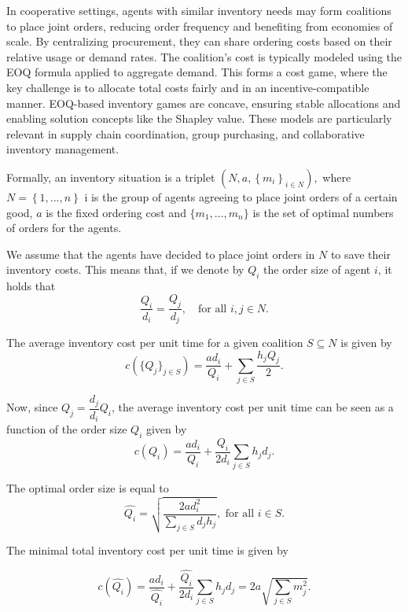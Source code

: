 \documentclass[12pt]{article}
\begin{document}
\noindent In cooperative settings, agents with similar inventory needs may form coalitions to place joint orders, reducing order frequency and benefiting from economies of scale. By centralizing procurement, they can share ordering costs based on their relative usage or demand rates. The coalition’s cost is typically modeled using the EOQ formula applied to aggregate demand. This forms a cost game, where the key challenge is to allocate total costs fairly and in an incentive-compatible manner. EOQ-based inventory games are concave, ensuring stable allocations and enabling solution concepts like the Shapley value. These models are particularly relevant in supply chain coordination, group purchasing, and collaborative inventory management.

\noindent Formally, an inventory situation is a triplet $\left( N,a,\left\{
m_{i}\right\} _{i\in N}\right) ,$ where $N=\left\{ 1,...,n\right\} $ i is the group of agents agreeing to place joint orders of a certain good, $a$
is the fixed ordering cost and $\{m_{1},\ldots ,m_{n}\}$ is the set of optimal
numbers of orders for the agents. 

We assume that the agents have decided to place joint orders in \( N \)  to save their
inventory costs. This means that, if we denote by \( Q_i \) the order size of  agent \( i \), it holds that 
\[
\frac{Q_i}{d_i} = \frac{Q_j}{d_j}, \quad \text{for all } i, j \in N.
\]

The average inventory cost per unit time for a given coalition $S \subseteq N$ is given by 
\begin{equation*}
c(\{Q_{j}\}_{j \in S})=\dfrac{ad_{i}}{Q_{i}}+\sum_{j\in S}\dfrac{h_{j}Q_{j}}{2}.
\end{equation*}


\noindent Now, since $Q_{j}=\dfrac{d_j}{d_i}Q_i$, the average inventory cost per unit time can be seen as a function of the order size $Q_{i}$ given by 
\begin{equation*}
c(Q_{i})=\dfrac{ad_{i}}{Q_{i}}+\dfrac{Q_{i}}{2d_{i}}\sum_{j\in S}h_{j}d_{j}.
\end{equation*}

The optimal order size is equal to 
\begin{equation*}
\hat {Q_{i}}=\sqrt{\dfrac{2ad_{i}^{2}}{\sum\nolimits_{j\in S}d_{j}h_{j}}},%
\text{ for all }i\in S.
\end{equation*}%

\noindent The minimal total inventory cost per unit time is given by 

\begin{equation*}
c(\hat{Q_{i}})=\dfrac{ad_{i}}{\hat{Q_{i}}}+\dfrac{\hat{Q_{i}}}{2d_{i}}\sum_{j\in S}h_{j}d_{j}=2a\sqrt{\sum_{j\in S}m_{j}^{2}}.
\end{equation*}
\end{document}
